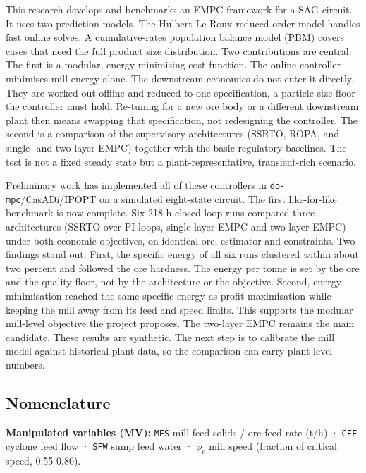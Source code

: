\documentclass[
  14pt,
]{extarticle}
\begin{document}
This research develops and benchmarks an EMPC framework for a SAG
circuit. It uses two prediction models. The Hulbert-Le Roux
reduced-order model handles fast online solves. A cumulative-rates
population balance model (PBM) covers cases that need the full product
size distribution. Two contributions are central. The first is a
modular, energy-minimising cost function. The online controller
minimises mill energy alone. The downstream economics do not enter it
directly. They are worked out offline and reduced to one specification,
a particle-size floor the controller must hold. Re-tuning for a new ore
body or a different downstream plant then means swapping that
specification, not redesigning the controller. The second is a
comparison of the supervisory architectures (SSRTO, ROPA, and single-
and two-layer EMPC) together with the basic regulatory baselines. The
test is not a fixed steady state but a plant-representative,
transient-rich scenario.

Preliminary work has implemented all of these controllers in
\texttt{do-mpc}/CasADi/IPOPT on a simulated eight-state circuit. The
first like-for-like benchmark is now complete. Six 218 h closed-loop
runs compared three architectures (SSRTO over PI loops, single-layer
EMPC and two-layer EMPC) under both economic objectives, on identical
ore, estimator and constraints. Two findings stand out. First, the
specific energy of all six runs clustered within about two percent and
followed the ore hardness. The energy per tonne is set by the ore and
the quality floor, not by the architecture or the objective. Second,
energy minimisation reached the same specific energy as profit
maximisation while keeping the mill away from its feed and speed limits.
This supports the modular mill-level objective the project proposes. The
two-layer EMPC remains the main candidate. These results are synthetic.
The next step is to calibrate the mill model against historical plant
data, so the comparison can carry plant-level numbers.

\newpage

\subsection{Nomenclature}\label{nomenclature}

\textbf{Manipulated variables (MV):} \texttt{MFS} mill feed solids / ore
feed rate (t/h) · \texttt{CFF} cyclone feed flow · \texttt{SFW} sump
feed water · $\phi_c$ mill speed (fraction of critical speed,
0.55-0.80).
\end{document}
